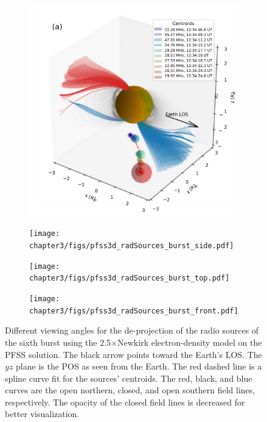 \begin{figure}[ht]
    \centering
    \begin{subfigure}{\linewidth}
        \centering
        \includegraphics[width=0.45\linewidth]{chapter3/figs/pfss3d_radSources_burst_angle.pdf}
        \label{subfig:a}
    \end{subfigure}
    \hfill
    \begin{subfigure}{\linewidth}
        \centering
        \texttt{[image: chapter3/figs/pfss3d\_radSources\_burst\_side.pdf]}
        \label{subfig:b}
    \end{subfigure}
    
    \begin{subfigure}{\linewidth}
        \centering
        \texttt{[image: chapter3/figs/pfss3d\_radSources\_burst\_top.pdf]}
        \label{subfig:c}
    \end{subfigure}
    \hfill
    \begin{subfigure}{\linewidth}
        \centering
        \texttt{[image: chapter3/figs/pfss3d\_radSources\_burst\_front.pdf]}
        \label{subfig:d}
    \end{subfigure}
    \caption{Different viewing angles for the de-projection of the radio sources of the sixth burst using the 2.5$\times$Newkirk electron-density model on the PFSS solution. The black arrow points toward the Earth's LOS. The $yz$ plane is the POS as seen from the Earth. The red dashed line is a spline curve fit for the sources' centroids. The red, black, and blue curves are the open northern, closed, and open southern field lines, respectively. The opacity of the closed field lines is decreased for better visualization.}
    \label{fig_3figs}
\end{figure}

